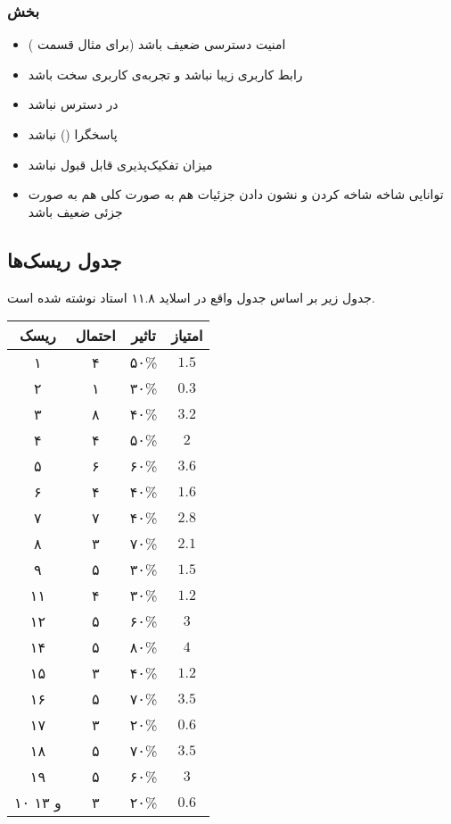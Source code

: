 \subsubsection{بخش }
\begin{itemize}
\item[\risk]
امنیت دسترسی ضعیف باشد (برای مثال قسمت )

\item[\risk]
رابط کاربری زیبا نباشد و تجربه‌ی کاربری سخت باشد

\item[\risk]
در دسترس نباشد

\item[\risk]
پاسخگرا () نباشد

\item[\risk]
میزان تفکیک‌پذیری قابل قبول نباشد

\item[\risk]
توانایی شاخه شاخه کردن و نشون دادن جزئیات هم به صورت کلی هم به صورت جزئی ضعیف باشد
\end{itemize}

\subsection{جدول ریسک‌ها}\label{risk-table}
جدول زیر بر اساس جدول واقع در اسلاید ۱۱.۸ استاد نوشته شده است.
\begin{table}[H]
\begin{center}
\begin{tabular}{|c|c|c|c|}
\hline
ریسک &
احتمال &
تاثیر &
امتیاز \\
\hline
\hline

۱ &
۴ &
۵۰\%&
$1.5$
\\
\hline
۲ &
۱ &
۳۰\%&
$0.3$\\
\hline
۳ &
۸ &
۴۰\%&
$3.2$\\
\hline
۴ &
۴ &
۵۰\%&
$2$\\
\hline
۵ &
۶ &
۶۰\% &
$3.6$\\
\hline
۶ &
۴ &
۴۰\%&
$1.6$\\
\hline
۷ &
۷ &
۴۰\%&
$2.8$\\
\hline
۸ &
۳ &
۷۰\%&
$2.1$\\
\hline
۹ &
۵ &
۳۰\%&
$1.5$\\
\hline
۱۱ &
۴ &
۳۰\%&
$1.2$\\
\hline
۱۲ &
۵ &
۶۰\%&
$3$\\
\hline
۱۴ &
۵ &
۸۰\%&
$4$\\
\hline
۱۵ &
۳ &
۴۰\%&
$1.2$\\
\hline
۱۶ &
۵ &
۷۰\%&
$3.5$\\
\hline
۱۷ &
۳ &
۲۰\%&
$0.6$\\
\hline
۱۸ &
۵ &
۷۰\%&
$3.5$\\
\hline
۱۹ &
۵&
۶۰\%&
$3$\\
\hline

۱۰ و ۱۳ &
۳&
۲۰\%&
$0.6$\\
\hline

\end{tabular}
\end{center}
\end{table}

